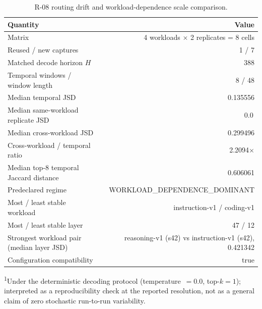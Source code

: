 \begin{table}[t]
\centering
\caption{R-08 routing drift and workload-dependence scale comparison.}
\label{tab:r2-08-summary}
\small
\begin{tabular}{@{}lr@{}}
\toprule
Quantity & Value \\
\midrule
Matrix & 4 workloads $\times$ 2 replicates = 8 cells \\
Reused / new captures & 1 / 7 \\
Matched decode horizon $H$ & 388 \\
Temporal windows / window length & 8 / 48 \\
Median temporal JSD & 0.135556 \\
Median same-workload replicate JSD & 0.0\,\footnotemark[1] \\
Median cross-workload JSD & 0.299496 \\
Cross-workload / temporal ratio & 2.2094$\times$ \\
Median top-8 temporal Jaccard distance & 0.606061 \\
Predeclared regime & WORKLOAD\_DEPENDENCE\_DOMINANT \\
Most / least stable workload & instruction-v1 / coding-v1 \\
Most / least stable layer & 47 / 12 \\
Strongest workload pair (median layer JSD) & reasoning-v1 (s42) vs instruction-v1 (s42), 0.421342 \\
Configuration compatibility & true \\
\bottomrule
\end{tabular}
\vspace{2pt}
\par\footnotesize\textsuperscript{1}Under the deterministic decoding protocol (temperature~$=0.0$, top-$k=1$); interpreted as a reproducibility check at the reported resolution, not as a general claim of zero stochastic run-to-run variability.
\end{table}
